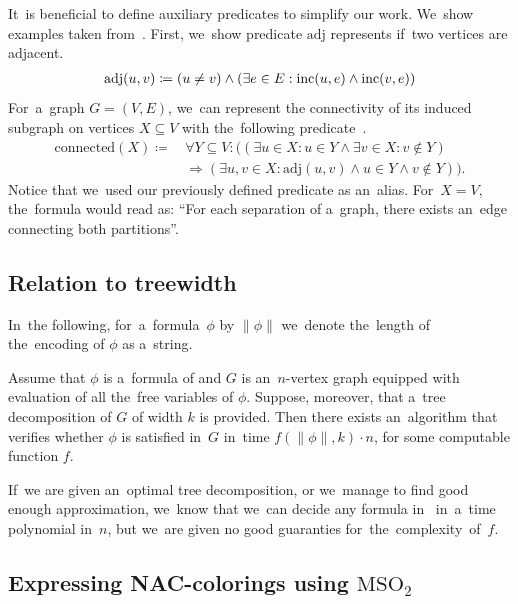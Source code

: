 It~is beneficial to define auxiliary predicates to simplify our work.
We~show examples taken from~\cite{book_parametrized_algorithms}.
First, we~show predicate \( \text{adj} \) represents if~two vertices are adjacent.
%
\begin{align*}
	\text{adj}(u, v) \coloneqq (u \ne v) \land (\exists e \in E : \text{inc} (u, e) \land \text{inc} (v, e))
\end{align*}
%
For~a~graph \( G = (V, E) \), we~can represent the connectivity of its induced subgraph
on vertices \( X \subseteq V \) with the~following predicate~\cite{book_parametrized_algorithms}.
%
\begin{align*}
	\text{connected}(X) \coloneqq \, &
	\forall Y \subseteq V : \Big(
	(
	\exists u \in X : u \in Y \land
	\exists v \in X : v \not\in Y
	)
	\\ &
	\Rightarrow
	(
	\exists u, v \in X : \text{adj}(u, v) \land u \in Y \land v \not\in Y
	)\Big).
\end{align*}
%
Notice that we~used our previously defined predicate as an~alias.
For~\( X = V \), the~formula would read as:
``For each separation of a~graph, there exists an~edge connecting both partitions''.

\subsection{Relation to treewidth}

In~the following, for~a~formula~\( \phi \) by \( \|\phi\| \)
we~denote the~length of the~encoding of \( \phi \) as a~string.
%
\begin{theorem}%
	\label{theorem:courcelles_theorem}%
	Assume that \( \phi \) is a~formula of \MSO{} and
	\( G \) is an~\( n \)-vertex graph equipped
	with evaluation of all the~free variables of \( \phi \).
	Suppose, moreover, that a~tree decomposition of \( G \) of width \( k \) is provided.
	Then there exists an~algorithm that verifies whether \( \phi \)
	is satisfied in~\( G \) in~time \( f (\|\phi\|, k) \cdot n \),
	for some computable function \( f \).
\end{theorem}
%
If~we are given an~optimal tree decomposition, or we~manage to find good enough
approximation, we~know that we~can decide any formula in~\MSO{} in~a~time
polynomial in~\( n \), but we~are given no good guaranties for~the~complexity~of~\( f \).

\subsection{Expressing NAC-colorings using \( \text{MSO}_2 \)}

